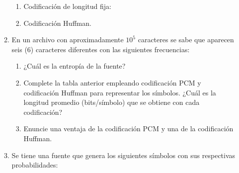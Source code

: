 \begin{enumerate}
\begin{enumerate}
\begin{enumerate}
		\item Codificación de longitud fija: 
		
		\item Codificación Huffman.
		
	\end{enumerate}
\item En un archivo con aproximadamente $10^5$ caracteres se sabe que aparecen seis (6) caracteres diferentes con las siguientes frecuencias:
\begin{table}[h]
    \captionsetup{justification = raggedright,singlelinecheck = false}
    \caption{Ejercicio d}
    \label{tabla:tabla18}
	\centering
\end{table}

\begin{enumerate}
	\item ¿Cuál es la entropía de la fuente? 
	
	\item Complete la tabla anterior empleando codificación PCM y codificación Huffman para representar los símbolos.  ¿Cuál es la longitud promedio (bits/símbolo) que se obtiene con cada codificación? 
	
	\item Enuncie una ventaja de la codificación PCM y una de la codificación Huffman.
	
\end{enumerate}
\item Se tiene una fuente que genera los siguientes símbolos con sus respectivas probabilidades:


\end{enumerate}
\end{enumerate}
